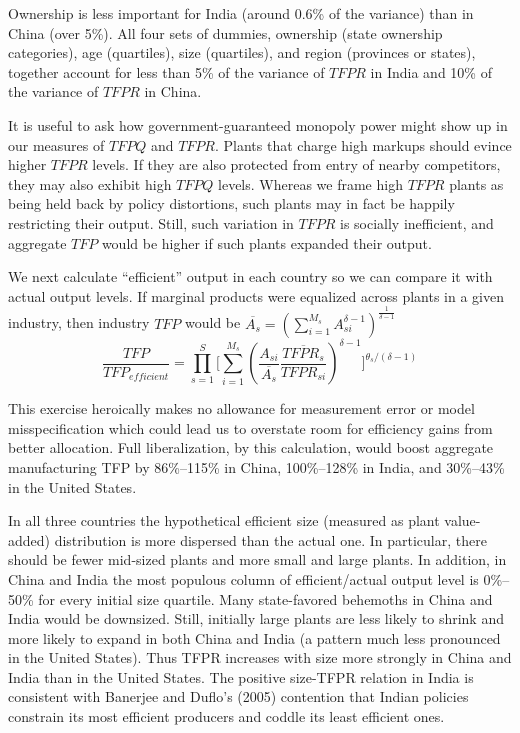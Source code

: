 \documentclass{article}
\begin{document}
Ownership is less important for India (around 0.6\% of the variance) than in China (over 5\%). All four sets of dummies, ownership (state ownership categories), age (quartiles), size (quartiles), and region (provinces or states), together account for less than 5\% of the variance of $TFPR$ in India and 10\% of the variance of $TFPR$ in China.

It is useful to ask how government-guaranteed monopoly power might show up in our measures of $TFPQ$ and $TFPR$. Plants that charge high markups should evince higher $TFPR$ levels. If they are also protected from entry of nearby competitors, they may also exhibit high $TFPQ$ levels. Whereas we frame high $TFPR$ plants as being held back by policy distortions, such plants may in fact be happily restricting their output. Still, such variation in $TFPR$ is socially inefficient, and aggregate $TFP$ would be higher if such plants expanded their output.

We next calculate “efficient” output in each country so we can compare it with actual output levels. If marginal products were equalized across plants in a given industry, then industry $TFP$ would be $\overline{A_s}=(\sum_{i=1}^{M_s}A_{si}^{\delta-1})^{\frac{1}{\delta-1}}$
\begin{equation*}
    \frac{TFP}{TFP_{efficient }}=\prod_{s=1}^S \biggl[ \sum_{i=1}^{M_s}(\frac{A_{si}}{\overline{A_s}} \frac{\overline{TFPR_s}}{TFPR_{si}})^{\delta-1} \biggr]^{\theta_s/(\delta-1)}
\end{equation*}

This exercise heroically makes no allowance for measurement error or model misspecification which could lead us to overstate room for efficiency gains from better allocation. Full liberalization, by this calculation, would boost aggregate manufacturing TFP by 86\%–115\% in China, 100\%–128\% in India, and 30\%–43\% in the United States.

In all three countries the hypothetical efficient size (measured as plant value-added) distribution is more dispersed than the actual one. In particular, there should be fewer mid-sized plants and more small and large plants. In addition, in China and India the most populous column of efficient/actual output level is 0\%–50\% for every initial size quartile. Many state-favored behemoths in China and India would be downsized. Still, initially large plants are less likely to shrink and more likely to expand in both China and India (a pattern much less pronounced in the United States). Thus TFPR increases with size more strongly in China and India than in the United States. The positive size-TFPR relation in India is consistent with Banerjee and Duflo’s (2005) contention that Indian policies constrain its most efficient producers and coddle its least efficient ones.
\end{document}

